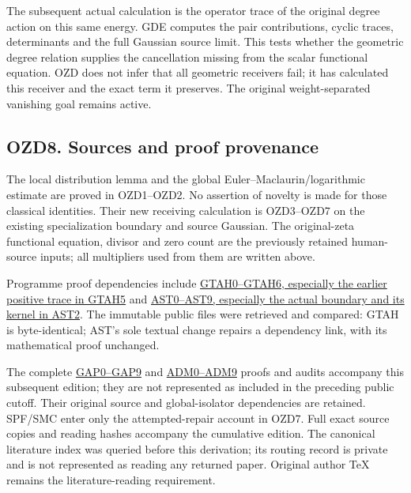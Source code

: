 The subsequent actual calculation is the operator trace of the original
degree action on this same energy. GDE computes the pair contributions,
cyclic traces, determinants and the full Gaussian source limit. This
tests whether the geometric degree relation supplies the cancellation
missing from the scalar functional equation. OZD does not infer that all
geometric receivers fail; it has calculated this receiver and the exact
term it preserves. The original weight-separated vanishing goal remains
active.

\subsection{OZD8. Sources and proof
provenance}\label{ozd8.-sources-and-proof-provenance}

The local distribution lemma and the global Euler--Maclaurin/logarithmic
estimate are proved in OZD1--OZD2. No assertion of novelty is made for
those classical identities. Their new receiving calculation is
OZD3--OZD7 on the existing specialization boundary and source Gaussian.
The original-zeta functional equation, divisor and zero count are the
previously retained human-source inputs; all multipliers used from them
are written above.

Programme proof dependencies include
\href{https://github.com/KokunoYumeto/zeta-function-research-reader/blob/36a82ecca98addb8a98b48204e349737856c7223/workbenches/splitzero-tandem/continuations/20260924-cohomology-weight-and-character-lifts/geometric-positive-quotient/GEOMETRIC_TRANSFER_POSITIVE_ADJOINT_DEFECT.md}{GTAH0--GTAH6,
especially the earlier positive trace in GTAH5} and
\href{https://github.com/KokunoYumeto/zeta-function-research-reader/blob/36a82ecca98addb8a98b48204e349737856c7223/workbenches/splitzero-tandem/continuations/20260924-cohomology-weight-and-character-lifts/geometric-positive-quotient/ADJOINT_DEFECT_SOURCE_TOPOLOGY_COMPARISON.md}{AST0--AST9,
especially the actual boundary and its kernel in AST2}. The immutable
public files were retrieved and compared: GTAH is byte-identical; AST's
sole textual change repairs a dependency link, with its mathematical
proof unchanged.

The complete \href{https://github.com/KokunoYumeto/zeta-function-research-reader/blob/main/workbenches/splitzero-tandem/continuations/20260925-source-endpoint-and-section/GAUSSIAN_FULL_SOURCE_APPROXIMATION.md}{GAP0--GAP9}
and \href{https://github.com/KokunoYumeto/zeta-function-research-reader/blob/main/workbenches/splitzero-tandem/continuations/20260925-source-endpoint-and-section/ACTUAL_DEFECT_MULTIPLIER_DOMAIN.md}{ADM0--ADM9} proofs and
audits accompany this subsequent edition; they are not represented as
included in the preceding public cutoff. Their original source and
global-isolator dependencies are retained. SPF/SMC enter only the
attempted-repair account in OZD7. Full exact source copies and reading
hashes accompany the cumulative edition. The canonical literature index
was queried before this derivation; its routing record is private and is
not represented as reading any returned paper. Original author TeX
remains the literature-reading requirement.

